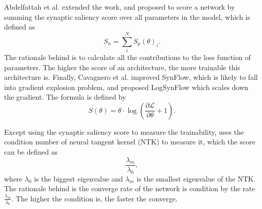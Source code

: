 \documentclass[sigconf]{acmart}
\begin{document}
    Abdelfattah et al. \cite{abdelfattah2021zerocost} extended the work, and proposed to score a 
    network by summing the synaptic saliency score over all parameters in the model, which is 
    defined as 
    \begin{equation}
        \label{equ:zero_cost}
        S_n=\sum^N_i S_p(\theta)_i.
    \end{equation}
    The rationale behind is to calculate all the contributions to the loss function of parameters. 
    The higher the score of an architecture, the more trainable this architecture is. 
    Finally, Cavagnero et al. \cite{Cavagnero_2023} improved SynFlow, which is likely to fall into 
    gradient explosion problem, and proposed LogSynFlow which scales down the gradient. 
    The formula is defined by 
    \begin{equation}
        \label{equ:logsynflow}
        S(\theta)=\theta\cdot\log(\frac{\partial \mathcal L}{\partial \theta}+1).
    \end{equation}

    Except using the synaptic saliency score to measure the trainability, 
    \cite{https://doi.org/10.48550/arxiv.2102.11535} uses the condition number of neural tangent 
    kernel (NTK) \cite{jacot2020neural} to measure it, which the score can be defined as 
    \begin{equation}
        \label{equ:cn_ntk}
        \frac{\lambda_m}{\lambda_0}, 
    \end{equation}
    where $\lambda_0$ is the biggest eigenvalue and $\lambda_m$ is the smallest eigenvalue of the 
    NTK. The rationale behind is the converge rate of the network is condition by the rate 
    $\frac{\lambda_m}{\lambda_0}$. The higher the condition is, the faster the converge. 
\end{document}

